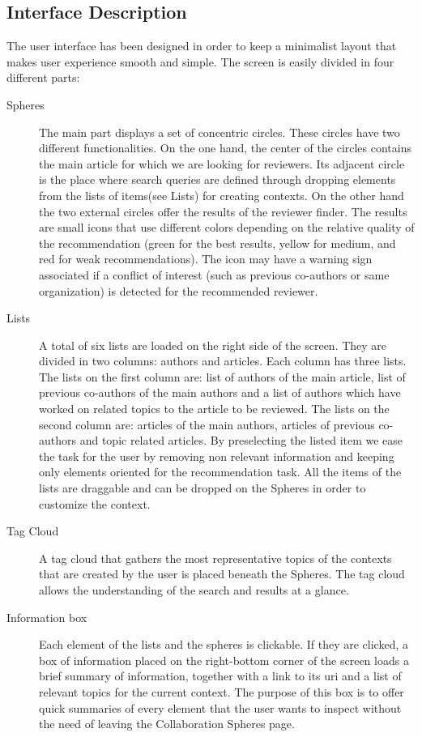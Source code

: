 \subsection{Interface Description}
The user interface has been designed in order to keep a minimalist layout that
makes user experience smooth and simple. The screen is easily divided in four
different parts:
\begin{description}
\item[Spheres]The main part displays a set of concentric circles. These circles
have two different functionalities. On the one hand, the center of the circles
contains the main article for which we are looking for reviewers. Its adjacent
circle is the place where search queries are defined through dropping elements
from the lists of items(see Lists) for creating contexts. On the other hand the
two external circles offer the results of the reviewer finder. The results are
small icons that use different colors depending on the relative quality of the
recommendation (green for the best results, yellow for medium, and red for weak
recommendations). The icon may have a warning sign associated if a conflict of
interest (such as previous co-authors or same organization) is detected for the
recommended reviewer.
\item[Lists]A total of six lists are loaded on the right side of the screen.
They are divided in two columns: authors and articles. Each column has three
lists. The lists on the first column are: list of authors of the main article,
list of previous co-authors of the main authors and a list of authors which have
worked on related topics to the article to be reviewed. The lists on the second
column are: articles of the main authors, articles of previous co-authors and
topic related articles. By preselecting the listed item we ease the task for the user by removing non relevant information and keeping only elements oriented for the recommendation task. All the items of the lists are draggable and can be
dropped on the Spheres in order to customize the context.
\item[Tag Cloud]A tag cloud that gathers the most representative topics of the
contexts that are created by the user is placed beneath the Spheres. The tag
cloud allows the understanding of the search and results at a glance.
\item[Information box]Each element of the lists and the spheres is clickable. If
they are clicked, a box of information placed on the right-bottom corner of the
screen loads a brief summary of information, together with a link to its uri and
a list of relevant topics for the current context. The purpose of this box is to offer quick summaries of every element that the user wants to inspect without the need of leaving the Collaboration Spheres page.
\end{description}

